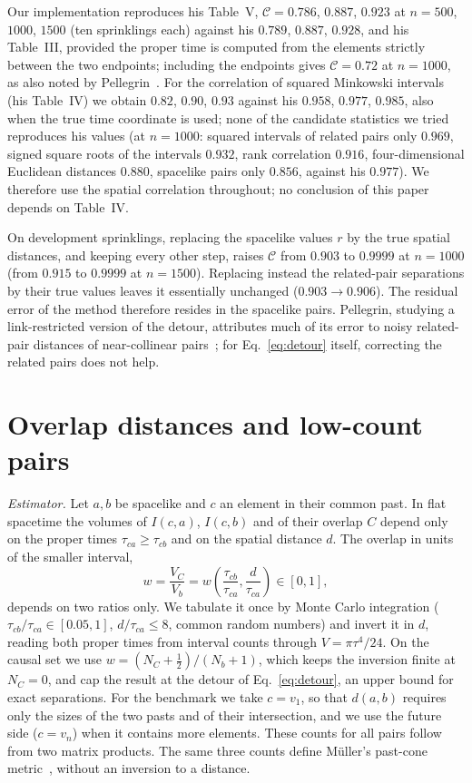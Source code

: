 \documentclass[prd,twocolumn,superscriptaddress,nofootinbib,amsmath,amssymb,floatfix]{revtex4-2}
\begin{document}
Our implementation reproduces his Table~V, $\mathcal C=0.786$, $0.887$, $0.923$ at $n=500$, $1000$, $1500$ (ten sprinklings each) against his $0.789$, $0.887$, $0.928$, and his Table~III, provided the proper time is computed from the elements strictly between the two endpoints; including the endpoints gives $\mathcal C=0.72$ at $n=1000$, as also noted by Pellegrin~\cite{Pellegrin26}. For the correlation of squared Minkowski intervals (his Table~IV) we obtain $0.82$, $0.90$, $0.93$ against his $0.958$, $0.977$, $0.985$, also when the true time coordinate is used; none of the candidate statistics we tried reproduces his values (at $n=1000$: squared intervals of related pairs only $0.969$, signed square roots of the intervals $0.932$, rank correlation $0.916$, four-dimensional Euclidean distances $0.880$, spacelike pairs only $0.856$, against his $0.977$). We therefore use the spatial correlation throughout; no conclusion of this paper depends on Table~IV.

On development sprinklings, replacing the spacelike values $r$ by the true spatial distances, and keeping every other step, raises $\mathcal C$ from $0.903$ to $0.9999$ at $n=1000$ (from $0.915$ to $0.9999$ at $n=1500$). Replacing instead the related-pair separations by their true values leaves it essentially unchanged ($0.903\to0.906$). The residual error of the method therefore resides in the spacelike pairs. Pellegrin, studying a link-restricted version of the detour, attributes much of its error to noisy related-pair distances of near-collinear pairs~\cite{Pellegrin26}; for Eq.~\eqref{eq:detour} itself, correcting the related pairs does not help.

\section{Overlap distances and low-count pairs}\label{sec:overlap}
\emph{Estimator.} Let $a,b$ be spacelike and $c$ an element in their common past. In flat spacetime the volumes of $I(c,a)$, $I(c,b)$ and of their overlap $C$ depend only on the proper times $\tau_{ca}\geq\tau_{cb}$ and on the spatial distance $d$. The overlap in units of the smaller interval,
\begin{equation}
w=\frac{V_C}{V_b}=w\!\left(\frac{\tau_{cb}}{\tau_{ca}},\frac{d}{\tau_{ca}}\right)\in[0,1],
\end{equation}
depends on two ratios only. We tabulate it once by Monte Carlo integration ($\tau_{cb}/\tau_{ca}\in[0.05,1]$, $d/\tau_{ca}\le8$, common random numbers) and invert it in $d$, reading both proper times from interval counts through $V=\pi\tau^4/24$. On the causal set we use $w=(N_C+\tfrac12)/(N_b+1)$, which keeps the inversion finite at $N_C=0$, and cap the result at the detour of Eq.~\eqref{eq:detour}, an upper bound for exact separations. For the benchmark we take $c=v_1$, so that $d(a,b)$ requires only the sizes of the two pasts and of their intersection, and we use the future side ($c=v_n$) when it contains more elements. These counts for all pairs follow from two matrix products. The same three counts define M\"uller's past-cone metric~\cite{Muller25}, without an inversion to a distance.
\end{document}
